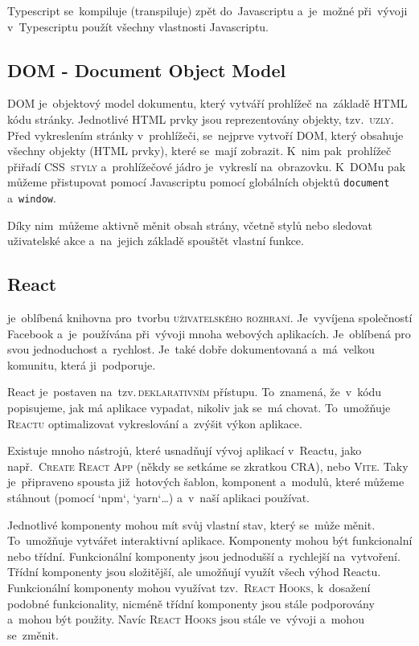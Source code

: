 \documentclass[14pt,a4paper]{article}
\begin{document}
        Typescript se~kompiluje (transpiluje) zpět do~Javascriptu a~je~možné při~vývoji v~Typescriptu použít všechny vlastnosti Javascriptu. \cite[Get started/TypeScript for the New Programmer]{TypeScript}

        \subsection{DOM - Document Object Model}
        DOM je~objektový model dokumentu, který vytváří prohlížeč na~základě HTML kódu stránky. Jednotlivé HTML prvky jsou reprezentovány objekty, tzv.~\textsc{uzly}. Před vykreslením stránky v~prohlížeči, se~nejprve vytvoří DOM, který obsahuje všechny objekty (HTML prvky), které se~mají zobrazit. K~nim pak~prohlížeč přiřadí \textsc{CSS~styly} a~prohlížečové jádro je~vykreslí na~obrazovku. K~DOMu pak můžeme přistupovat pomocí Javascriptu pomocí globálních objektů \texttt{document} a~\texttt{window}.
        
        Díky nim~můžeme aktivně měnit obsah strány, včetně stylů nebo sledovat uživatelské akce a~na~jejich základě spouštět vlastní funkce.\cite[2.1.01]{kantor_javascript}

        \subsection{React} je~oblíbená knihovna pro~tvorbu \textsc{uživatelského rozhraní}. Je~vyvíjena společností Facebook a~je~používána při~vývoji mnoha webových aplikacích. Je~oblíbená pro svou jednoduchost a~rychlost. Je~také dobře dokumentovaná a~má~velkou komunitu, která ji~podporuje.
        
        React je~postaven na~tzv.\,\textsc{deklarativním} přístupu. To~znamená, že~v~kódu popisujeme, jak má aplikace vypadat, nikoliv jak se~má chovat. To~umožňuje \textsc{Reactu} optimalizovat vykreslování a~zvýšit výkon aplikace.
        
        Existuje mnoho nástrojů, které usnadňují vývoj aplikací v~Reactu, jako např.~\textsc{Create React App} (někdy se setkáme se zkratkou CRA), nebo \textsc{Vite}. Taky je~připraveno spousta již~hotových šablon, komponent a~modulů, které můžeme stáhnout (pomocí `npm`, `yarn`\dots) a~v~naší aplikaci používat.


        Jednotlivé komponenty mohou mít svůj vlastní stav, který se~může měnit. To~umožňuje vytvářet interaktivní aplikace.
        Komponenty mohou být funkcionalní nebo třídní. Funkcionální komponenty jsou jednodušší a~rychlejší na~vytvoření.
        Třídní komponenty jsou složitější, ale umožňují využít všech výhod Reactu. Funkcionální komponenty mohou využívat tzv.~\textsc{React Hooks}, k~dosažení podobné funkcionality, nicméně třídní komponenty jsou stále podporovány a~mohou být použity.
        Navíc \textsc{React Hooks} jsou stále ve~vývoji a~mohou se~změnit.
\end{document}
